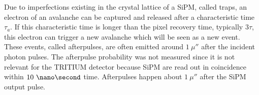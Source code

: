 
Due to imperfections existing in the crystal lattice of a SiPM, called traps, an electron of an avalanche can be captured and released after a characteristic time $\tau_a$. If this characteristic time is longer than the pixel recovery time, typically $3\tau$, this electron can trigger a new avalanche which will be seen as a new event. These events, called  afterpulses, are often emitted around $1~\mu\second$ after the incident photon pulses. The afterpulse probability was not measured since it is not relevant for the TRITIUM detector because SiPM are read out in coincidence within $10~\nano\second$ time. Afterpulses happen about $1~\mu\second$ after the SiPM output pulse.

